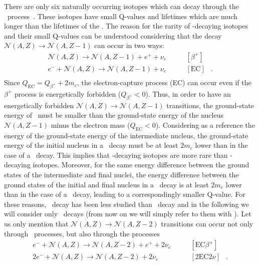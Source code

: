 \marginnote{$2\nu\beta^+\beta^+$}
There are only six naturally occurring isotopes which can decay through the
\nnbbp\ process~\cite{Haxton1985}. These isotopes have small Q-values and
lifetimes which are much longer than the lifetimes of the \nnbbm. The reason
for the rarity of \nnbbp-decaying isotopes and their small Q-values can be
understood considering that the decay $\mathcal{N}(A,Z) \rightarrow
\mathcal{N}(A,Z-1)$ can occur in two ways:
\[
  \begin{array}{lrl}
    \mathcal{N}(A,Z) \rightarrow \mathcal{N}(A,Z-1) + e^+ + \nu_e &
      \qquad [\beta^+] & \\
    e^- + \mathcal{N}(A,Z) \rightarrow \mathcal{N}(A,Z-1) + \nu_e &
      \qquad [\text{EC}] & . \\
  \end{array}
\]
Since $Q_\text{EC} = Q_{\beta^+}+2m_e$, the electron-capture process (EC) can
occur even if the $\beta^+$ process is energetically forbidden ($Q_{\beta^+} <
0$). Thus, in order to have an energetically forbidden
$\mathcal{N}(A,Z)\rightarrow\mathcal{N}(A,Z-1)$ transitions, the ground-state
energy of \NAZ\ must be smaller than the ground-state energy of the nucleus
$\mathcal{N}(A,Z-1)$ minus the electron mass ($Q_\text{EC}<0$).  Considering as
a reference the energy of the ground-state energy of the intermediate nucleus,
the ground-state energy of the initial nucleus in a \nnbbp\ decay must be at
least $2m_e$ lower than in the case of a \nnbbm\ decay. This implies that
\nnbbp-decaying isotopes are more rare than \nnbbm-decaying isotopes. Moreover,
for the same energy difference between the ground states of the intermediate
and final nuclei, the energy difference between the ground states of the
initial and final nucleus in a \nnbbp\ decay is at least $2m_e$ lower than in
the case of a \nnbbm\ decay, leading to a correspondingly smaller Q-value. For
these reasons, \nnbbp\ decay has been less studied than \nnbbm\ decay and in
the following we will consider only \nnbbm\ decays (from now on we will simply
refer to them with \nnbb). Let us only mention that $\mathcal{N}(A,Z)
\rightarrow \mathcal{N}(A,Z-2)$ transitions can occur not only through \nnbbp\
processes, but also through the processes
\[
  \begin{array}{lrl}
    e^- + \mathcal{N}(A,Z) \rightarrow \mathcal{N}(A,Z-2) + e^+ + 2\nu_e &
      \qquad [\text{EC}\beta^+] & \\
    2e^- + \mathcal{N}(A,Z) \rightarrow \mathcal{N}(A,Z-2) + 2\nu_e &
      \qquad [2\text{EC}2\nu] & . \\
  \end{array}
\]

